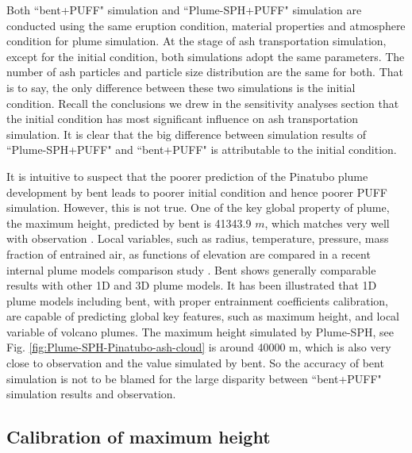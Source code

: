 Both ``bent+PUFF" simulation and ``Plume-SPH+PUFF" simulation are conducted using the same eruption condition, material properties and atmosphere condition for plume simulation. At the stage of ash transportation simulation, except for the initial condition, both simulations adopt the same parameters. The number of ash particles and particle size distribution are the same for both. That is to say, the only difference between these two simulations is the initial condition. Recall the conclusions we drew in the sensitivity analyses section that the initial condition has most significant influence on ash transportation simulation. It is clear that the big difference between simulation results of ``Plume-SPH+PUFF" and ``bent+PUFF" is attributable to the initial condition.

It is intuitive to suspect that the poorer prediction of the Pinatubo plume development by bent leads to poorer initial condition and hence poorer PUFF simulation. However, this is not true. One of the key global property of plume, the maximum height, predicted by bent is 41343.9 $m$, which matches very well with observation \citep{lynch1996mount}. Local variables, such as radius, temperature, pressure, mass fraction of entrained air, as functions of elevation are compared in a recent internal plume models comparison study \citep{costa2016results}. Bent shows generally comparable results with other 1D and 3D plume models. It has been illustrated that 1D plume models including bent, with proper entrainment coefficients calibration, are capable of predicting global key features, such as maximum height, and local variable of volcano plumes. The maximum height simulated by Plume-SPH, see Fig. \ref{fig:Plume-SPH-Pinatubo-ash-cloud} is around 40000 m, which is also very close to observation and the value simulated by bent. So the accuracy of bent simulation is not to be blamed for the large disparity between ``bent+PUFF" simulation results and observation.

\subsection{Calibration of maximum height}

